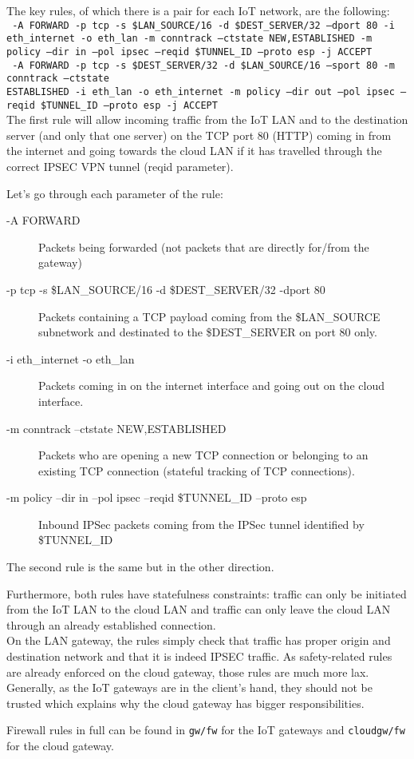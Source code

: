 \documentclass[paper=a4, fontsize=11pt]{scrartcl}
\begin{document}
The key rules, of which there is a pair for each IoT network, are the following:
\\

\texttt{%
    -A FORWARD -p tcp -s \$LAN\_SOURCE/16 -d \$DEST\_SERVER/32 --dport 80 -i
    eth\_internet -o eth\_lan -m conntrack --ctstate NEW,ESTABLISHED -m policy
    --dir in --pol ipsec --reqid \$TUNNEL\_ID --proto esp -j ACCEPT
}
\\

\texttt{%
    -A FORWARD -p tcp -s \$DEST\_SERVER/32 -d \$LAN\_SOURCE/16 --sport 80 -m
    conntrack --ctstate \\ESTABLISHED -i eth\_lan -o eth\_internet -m policy --dir
    out --pol ipsec --reqid \$TUNNEL\_ID --proto esp -j ACCEPT
}
\\

The first rule will allow incoming traffic from the IoT LAN and to the
destination server (and only that one server) on the TCP port 80 (HTTP) coming
in from the internet and going towards the cloud LAN if it has travelled
through the correct IPSEC VPN tunnel (reqid parameter).

Let's go through each parameter of the rule:
\begin{description}
    \item [-A FORWARD] Packets being forwarded (not packets that are directly
        for/from the gateway)
    \item [-p tcp -s \$LAN\_SOURCE/16 -d \$DEST\_SERVER/32 -dport 80] Packets 
        containing a TCP payload coming from the \$LAN\_SOURCE subnetwork and
        destinated to the \$DEST\_SERVER on port 80 only.
    \item [-i eth\_internet -o eth\_lan] Packets coming in on the internet
        interface and going out on the cloud interface.
    \item [-m conntrack --ctstate NEW,ESTABLISHED] Packets who are opening a new
        TCP connection or belonging to an existing TCP connection (stateful
        tracking of TCP connections).
    \item [-m policy --dir in --pol ipsec --reqid \$TUNNEL\_ID --proto esp]
        Inbound IPSec packets coming from the IPSec tunnel identified by
        \$TUNNEL\_ID
\end{description}

The second rule is the same but in the other direction.

Furthermore, both rules have statefulness constraints: traffic can only be
initiated from the IoT LAN to the cloud LAN and traffic can only leave the cloud
LAN through an already established connection.
\\

On the LAN gateway, the rules simply check that traffic has proper origin and
destination network and that it is indeed IPSEC traffic.
As safety-related rules are already enforced on the cloud gateway, those rules
are much more lax.
Generally, as the IoT gateways are in the client's hand, they should not be
trusted which explains why the cloud gateway has bigger responsibilities.

Firewall rules in full can be found in \texttt{gw/fw} for the IoT gateways and
\texttt{cloudgw/fw} for the cloud gateway.
\end{document}
